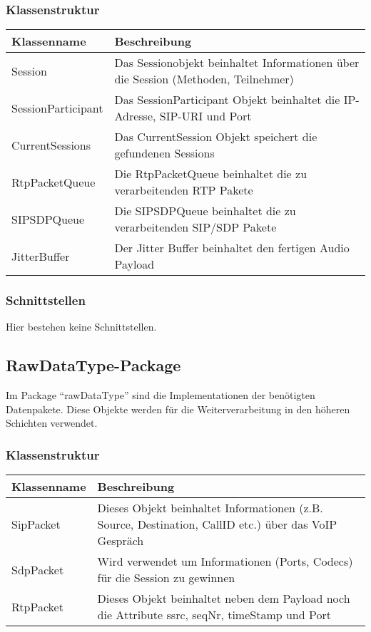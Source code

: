 \documentclass[a4,12pt]{scrartcl}
\begin{document}
\subsubsection{Klassenstruktur}
\begin{table}[H]
\centering
    \begin{tabular}{@{}l p{11cm} @{}}\toprule    
    {Klassenname} & {Beschreibung}\\ \midrule
     Session&  
Das Sessionobjekt beinhaltet Informationen über die Session (Methoden, Teilnehmer)
\\ \addlinespace
     SessionParticipant & 
Das SessionParticipant Objekt beinhaltet die IP-Adresse, SIP-URI und Port
 \\ \addlinespace
       CurrentSessions& 
Das CurrentSession Objekt speichert die gefundenen Sessions
 \\ \addlinespace
       RtpPacketQueue & 
Die RtpPacketQueue beinhaltet die zu verarbeitenden RTP Pakete
 \\ \addlinespace
       SIPSDPQueue  &  
Die SIPSDPQueue beinhaltet die zu verarbeitenden SIP/SDP Pakete
\\ \addlinespace
        JitterBuffer  & 
Der Jitter Buffer beinhaltet den fertigen Audio Payload
 \\ 
    \bottomrule
    \end{tabular}
\end{table}
\subsubsection{Schnittstellen}
Hier bestehen keine Schnittstellen.

\subsection{RawDataType-Package}
Im Package “rawDataType” sind die Implementationen der benötigten Datenpakete. Diese Objekte werden für die Weiterverarbeitung in den höheren Schichten verwendet.

\subsubsection{Klassenstruktur}
\begin{table}[H]
\centering
    \begin{tabular}{@{}l p{11cm} @{}}\toprule    
    {Klassenname} & {Beschreibung}\\ \midrule
     SipPacket& 
Dieses Objekt beinhaltet Informationen (z.B. Source, Destination, CallID etc.) über das VoIP Gespräch
 \\ \addlinespace
       SdpPacket   & 
Wird verwendet um Informationen (Ports, Codecs) für die Session zu gewinnen
 \\ \addlinespace
        RtpPacket       & 
Dieses Objekt beinhaltet neben dem Payload noch die Attribute ssrc, seqNr, timeStamp und Port 
 \\ 
    \bottomrule
    \end{tabular}
\end{table}
\end{document}
